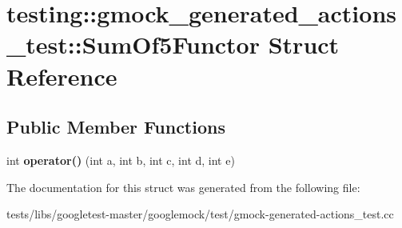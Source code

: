 \hypertarget{structtesting_1_1gmock__generated__actions__test_1_1SumOf5Functor}{}\section{testing\+:\+:gmock\+\_\+generated\+\_\+actions\+\_\+test\+:\+:Sum\+Of5\+Functor Struct Reference}
\label{structtesting_1_1gmock__generated__actions__test_1_1SumOf5Functor}
\subsection*{Public Member Functions}
\begin{DoxyCompactItemize}
\item 
\mbox{\label{structtesting_1_1gmock__generated__actions__test_1_1SumOf5Functor_aa3d751efb237e12ecdf1528f2b73da04}} 
int {\bfseries operator()} (int a, int b, int c, int d, int e)
\end{DoxyCompactItemize}


The documentation for this struct was generated from the following file\+:\begin{DoxyCompactItemize}
\item 
tests/libs/googletest-\/master/googlemock/test/gmock-\/generated-\/actions\+\_\+test.\+cc\end{DoxyCompactItemize}
